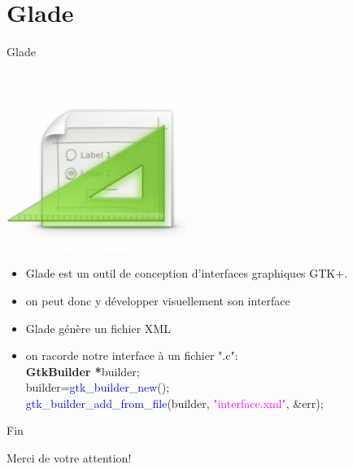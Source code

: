 \documentclass{beamer}
\begin{document}
\section{Glade}

\begin{frame}{Glade}
    \begin{center}
    \includegraphics[scale=0.33]{glade_logo.png}
    \end{center}
    \begin{itemize}
    \item Glade est un outil de conception d'interfaces graphiques GTK+.
    \item on peut donc y développer visuellement son interface
    \item Glade génère un fichier XML
    \item on racorde notre interface à un fichier ".c":\\
    \hspace{0.3cm} \textbf{GtkBuilder *}builder;\\
    \hspace{0.3cm} builder=\textcolor{blue}{gtk\_builder\_new}();\\
    \hspace{0.3cm} \textcolor{blue}{gtk\_builder\_add\_from\_file}(builder, \textcolor{magenta}{"interface.xml"}, \&err);\\
    \end{itemize}
\end{frame}

\begin{frame}{Fin}
    \begin{center}
        Merci de votre attention!
    \end{center}
\end{frame}
\end{document}
